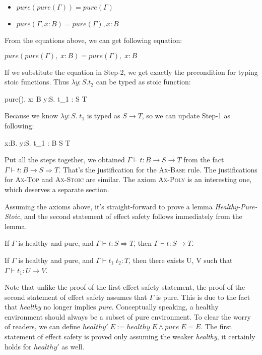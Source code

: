 \begin{itemize}
\item $pure(pure(\Gamma)) = pure(\Gamma)$
\item $pure(\Gamma, x:B) = pure(\Gamma), x:B$
\end{itemize}

From the equations above, we can get following equation:

\begin{center}
  $pure(pure(\Gamma),\; x: B) = pure(\Gamma),\; x: B$
\end{center}

If we substitute the equation in Step-2, we get exactly the
precondition for typing stoic functions. Thus $\lambda y:S.t_2$ can be
typed as stoic function:

{ pure(\Gamma),\; x: B \vdash \lambda y:S. \; t_1 : S \to T }

Because we know $\lambda y:S. \; t_1$ is typed as $S \to T$, so we can
update Step-1 as following:

{ \Gamma \vdash \lambda x:B. \lambda y:S. \; t_1 : B \to S \to T }

Put all the steps together, we obtained
$\Gamma \vdash t : B \to S \to T$ from the fact
$\Gamma \vdash t : B \to S \Rightarrow T$. That's the justification
for the \textsc{Ax-Base} rule. The justifications for \textsc{Ax-Top}
and \textsc{Ax-Stoic} are similar. The axiom \textsc{Ax-Poly} is an
interesting one, which deserves a separate section.

Assuming the axioms above, it's straight-forward to prove a lemma
\emph{Healthy-Pure-Stoic}, and the second statement of effect safety
follows immediately from the lemma.

\begin{lemma}
  If $\Gamma$ is healthy and pure,  and $\Gamma \vdash t : S
  \Rightarrow T$, then $\Gamma \vdash t : S \to T$.
\end{lemma}

\begin{theorem}
  If $\Gamma$ is healthy and pure, and $\Gamma \vdash t_1 \; t_2 :
  T$, then there exists U, V such that $\Gamma \vdash t_1 : U \to V$.
\end{theorem}

Note that unlike the proof of the first effect safety statement, the
proof of the second statement of effect safety assumes that $\Gamma$
is pure. This is due to the fact that \emph{healthy} no longer implies
\emph{pure}. Conceptually speaking, a healthy environment should
always be a subset of pure environment. To clear the worry of readers,
we can define $healthy' \; E := healthy \; E \wedge pure \; E = E$.
The first statement of effect safety is proved only assuming the
weaker \emph{healthy}, it certainly holds for $healthy'$ as well.


